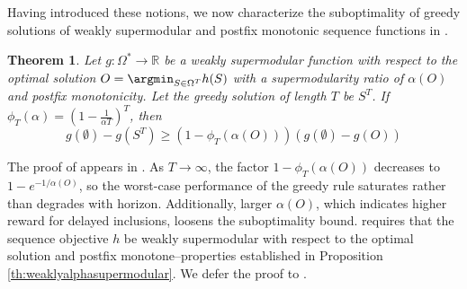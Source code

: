 \documentclass{article}
\newtheorem{theorem}{Theorem}[section]
\begin{document}


Having introduced these notions, we now characterize the suboptimality of greedy solutions of weakly supermodular and 
postfix monotonic sequence functions in .
\begin{theorem} \label{th:suboptgreedy}
    Let $g: \Omega^* \to \mathbb{R}$ be a weakly supermodular function with respect to the optimal solution $O = \argmin_{S \in \Omega^T} h(S)$ with a supermodularity ratio of $\alpha(O)$ and 
    postfix monotonicity. Let the greedy solution of length $T$ be $S^T$. If $\phi_T(\alpha) =  \left(1 - \frac{1}{\alpha T}\right)^T$, then
    \begin{equation*}
        g(\emptyset) - g(S^T)\geq \left(1 - \phi_T(\alpha(O))\right)\left(g(\emptyset) - g(O)\right)
    \end{equation*}
\end{theorem}

The proof of  appears in . As $T \to \infty$, the factor $1 - \phi_T(\alpha(O))$ decreases to $1 - e^{-1/\alpha(O)}$, so the worst-case performance of the greedy rule saturates rather than degrades with horizon. Additionally, larger $\alpha(O)$, which indicates higher reward for delayed inclusions, loosens the suboptimality bound.  
 requires that the sequence objective $h$ be weakly supermodular with respect to the optimal solution and postfix monotone--properties established in Proposition \ref{th:weaklyalphasupermodular}. We defer the proof to .
\end{document}
